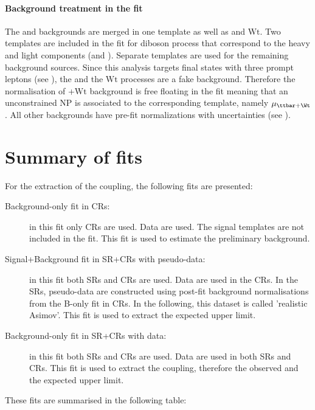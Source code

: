 \paragraph{Background treatment in the fit} The \ttZ and \tWZ backgrounds are merged in one template as well as
\ttbar and $\mathrm{Wt}$. Two templates are included in the fit for diboson process that correspond to the heavy and light components (\VVHF and \VVLF).
Separate templates are used for the remaining background sources.
Since this analysis targets final states with three prompt leptons (see ), the \ttbar and the $\mathrm{Wt}$ processes are a fake background. Therefore the normalisation of \ttbar+$\mathrm{Wt}$ background is free floating in the fit meaning that an unconstrained NP is associated to the corresponding template, namely $\mu_{\ttbar+\Wt}$.
All other backgrounds have pre-fit normalizations with uncertainties (see ).

\clearpage
\FloatBarrier

\section{Summary of fits}
\label{sec:stat:summary}
For the extraction of the \tZc coupling, the following fits
are presented:
\begin{description}
	\item[Background-only fit in CRs:] in this fit only CRs are used. Data are
	used. The signal templates are not included in the fit. This fit is used to estimate
	the preliminary background.
	\item[Signal+Background fit in SR+CRs with pseudo-data:] in this fit both SRs and CRs are used.
	Data are used in the CRs. In the SRs, pseudo-data are constructed
	using post-fit background normalisations from the B-only fit in CRs. In the following, this dataset is called 'realistic Asimov'. This fit is used to extract the expected upper limit.
	\item[Background-only fit in SR+CRs with data:] in this fit both SRs and CRs are used. Data are used in both 
	SRs and CRs. This fit is used to extract the \tZc coupling, therefore the observed and the expected upper limit.
\end{description}
These fits are summarised in the following table:

